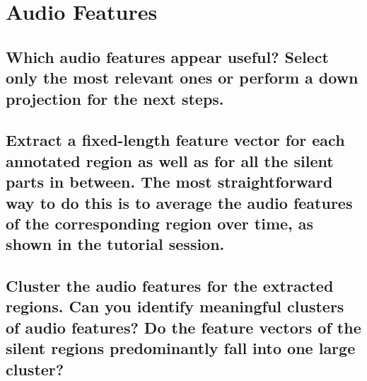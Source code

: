 
\section{Audio Features}
\label{sec:Audio Features}


\subsection{Which audio features appear useful? Select only the most relevant ones or perform a down projection 
for the next steps.}
\label{sec:Audio Features:a}
\lipsum[2]

\subsection{Extract a fixed-length feature vector for each annotated region as well as for all the silent parts in
between. The most straightforward way to do this is to average the audio features of the corresponding
region over time, as shown in the tutorial session.}
\label{sec:Audio Features:b}


\subsection{Cluster the audio features for the extracted regions. Can you identify meaningful clusters of audio
features? Do the feature vectors of the silent regions predominantly fall into one large cluster?}
\label{sec:Audio Features:c}



